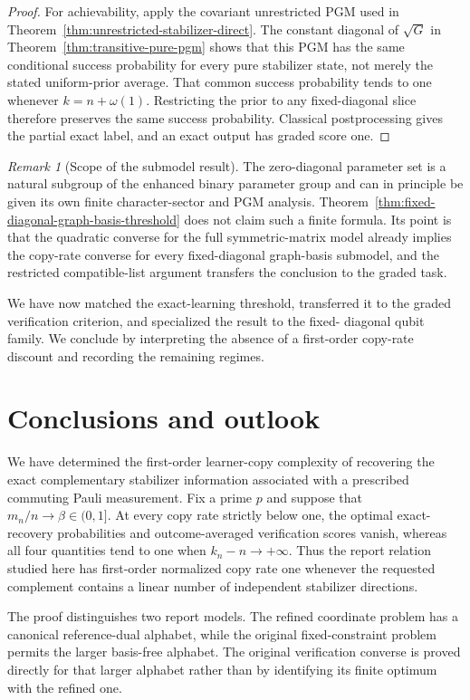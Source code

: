 \documentclass[11pt]{article}
\newcommand{\1}{\mathbf 1}
\theoremstyle{plain}
\theoremstyle{definition}
\theoremstyle{remark}
\newtheorem{remark}[theorem]{Remark}
\begin{document}
\begin{proof}
For achievability, apply the covariant unrestricted PGM used in
Theorem~\ref{thm:unrestricted-stabilizer-direct}.  The constant diagonal of
$\sqrt G$ in Theorem~\ref{thm:transitive-pure-pgm} shows that this PGM has
the same conditional success probability for every pure stabilizer state,
not merely the stated uniform-prior average.  That common success probability
tends to one whenever $k=n+\omega(1)$.  Restricting the prior to any fixed-diagonal
slice therefore preserves the same success probability.  Classical
postprocessing gives the partial exact label, and an exact output has graded
score one.
\end{proof}

\begin{remark}[Scope of the submodel result]
The zero-diagonal parameter set is a natural subgroup of the enhanced binary
parameter group and can in principle be given its own finite character-sector
and PGM analysis.  Theorem~\ref{thm:fixed-diagonal-graph-basis-threshold} does
not claim such a finite formula.  Its point is that the quadratic converse for
the full symmetric-matrix model already implies the copy-rate converse for
every fixed-diagonal graph-basis submodel, and the restricted compatible-list
argument transfers the conclusion to the graded task.
\end{remark}
We have now matched the exact-learning threshold, transferred it to the
graded verification criterion, and specialized the result to the fixed-
diagonal qubit family.  We conclude by interpreting the absence of a
first-order copy-rate discount and recording the remaining regimes.

\section{Conclusions and outlook}  
\label{sec:discussion}  
We have determined the first-order learner-copy complexity of recovering the  
exact complementary stabilizer information associated with a prescribed  
commuting Pauli measurement.  Fix a prime $p$ and suppose that  
$m_n/n\to\beta\in(0,1]$.  At every copy rate strictly below one, the optimal  
exact-recovery probabilities and outcome-averaged verification scores vanish,  
whereas all four quantities tend to one when $k_n-n\to+\infty$.  Thus the  
report relation studied here has first-order normalized copy rate one whenever  
the requested complement contains a linear number of independent stabilizer  
directions.  

The proof distinguishes two report models.  The refined coordinate problem has  
a canonical reference-dual alphabet, while the original fixed-constraint  
problem permits the larger basis-free alphabet.  The original verification  
converse is proved directly for that larger alphabet rather than by identifying  
its finite optimum with the refined one.  
\end{document}
